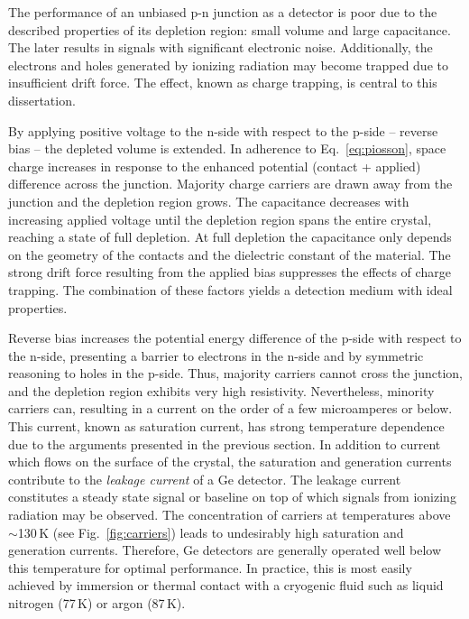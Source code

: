 The performance of an unbiased p-n junction as a detector is poor due to the described properties of its depletion region: small volume and large capacitance. The later results in signals with significant electronic noise. Additionally, the electrons and holes generated by ionizing radiation may become trapped due to insufficient drift force. The effect, known as charge trapping, is central to this dissertation.

By applying positive voltage to the n-side with respect to the p-side -- reverse bias -- the depleted volume is extended. In adherence to Eq.~\ref{eq:piosson}, space charge increases in response to the enhanced potential (contact + applied) difference across the junction. Majority charge carriers are drawn away from the junction and the depletion region grows. The capacitance decreases with increasing applied voltage until the depletion region spans the entire crystal, reaching a state of full depletion. At full depletion the capacitance only depends on the geometry of the contacts and the dielectric constant of the material. The strong drift force resulting from the applied bias suppresses the effects of charge trapping. The combination of these factors yields a detection medium with ideal properties. 

Reverse bias increases the potential energy difference of the p-side with respect to the n-side, presenting a barrier to electrons in the n-side and by symmetric reasoning to holes in the p-side. Thus, majority carriers cannot cross the junction, and the depletion region exhibits very high resistivity. Nevertheless, minority carriers can, resulting in a current on the order of a few microamperes or below. This current, known as saturation current, has strong temperature dependence due to the arguments presented in the previous section. In addition to current which flows on the surface of the crystal, the saturation and generation currents contribute to the \textit{leakage current} of a Ge detector. The leakage current constitutes a steady state signal or baseline on top of which signals from ionizing radiation may be observed. The concentration of carriers at temperatures above $\sim$130\,K (see Fig.~\ref{fig:carriers}) leads to undesirably high saturation and generation currents. Therefore, Ge detectors are generally operated well below this temperature for optimal performance. In practice, this is most easily achieved by immersion or thermal contact with a cryogenic fluid such as liquid nitrogen (77\,K) or argon (87\,K).

